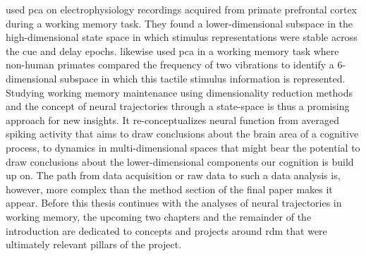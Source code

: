 \citet{murray2017stable} used \gls{pca} on electrophysiology recordings acquired from primate prefrontal cortex during a working memory task.
They found a lower-dimensional subspace in the high-dimensional state space in which stimulus representations were stable across the cue and delay epochs.
\citet{machens2010functional} likewise used \gls{pca} in a working memory task where non-human primates compared the frequency of two vibrations to identify a 6-dimensional subspace in which this tactile stimulus information is represented.\\
Studying working memory maintenance using dimensionality reduction methods and the concept of neural trajectories through a state-space is thus a promising approach for new insights.
It re-conceptualizes neural function from averaged spiking activity that aims to draw conclusions about the brain area of a cognitive process, to dynamics in multi-dimensional spaces that might bear the potential to draw conclusions about the lower-dimensional components our cognition is build up on.
The path from data acquisition or raw data to such a data analysis is, however, more complex than the method section of the final paper makes it appear.
Before this thesis continues with the analyses of neural trajectories in working memory, the upcoming two chapters and the remainder of the introduction are dedicated to concepts and projects around \gls{rdm} that were ultimately relevant pillars of the project.



